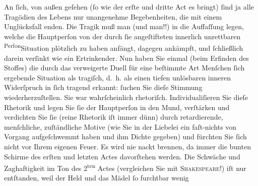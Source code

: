 \pstart
           An{ }ſich, von außen geſehen (ſo wie der erſte und dritte Act es bringt){ }ſind ja alle Tragödien des Lebens nur unangenehme
               Begebenheiten, die mit einem Unglücksfall enden. Die Tragik muß man (und  man!!) in die Auffaſſung legen, welche die
               Hauptperſon von der durch{ }ſie angeſtifteten {\pb}innerlich unrettbaren \substVorne{}\textsuperscript{Perſon}\substDazwischen{}Situation\substHinten{} plötzlich zu haben anfängt, dagegen ankämpft, und{ }ſchließlich darein
               verſinkt wie ein Ertrinkender. Nun haben Sie einmal (beim Erfinden des Stoffes) die durch das
               verweigerte Duell für eine beſtimmte Art Menſchen{ }ſich ergebende Situation als
               tragiſch, d. h. als einen tiefen unlösbaren inneren Widerſpruch in{ }ſich tragend
               erkannt: {\pb}ſuchen Sie dieſe
               Stimmung wiederherzuſtellen. Sie war wahrſcheinlich rhetoriſch. Individualiſieren Sie
               dieſe Rhetorik und legen Sie{ }ſie der Hauptperſon in den Mund, verſtärken und
               verdichten Sie{ }ſie (reine Rhetorik iſt immer dünn) durch retardierende, menſchliche,
               zuſtändliche Motive (wie Sie in der Liebelei ein
               faſt-nichts von Vorgang aufgeſchwemmt haben und ihm Dichte gegeben) {\pb}und fürchten Sie{ }ſich nicht vor
               Ihrem eigenen Feuer. Es wird nie nackt brennen, da immer die bunten Schirme des
               erſten und letzten Actes davorſtehen werden. Die Schwäche und Zaghaftigkeit im Ton
               des 2\textsuperscript{ten} Actes (vergleichen Sie mit \textsc{Shakeſpeare}!) iſt nur entſtanden, weil der Held und das Mädel{ }ſo furchtbar wenig
